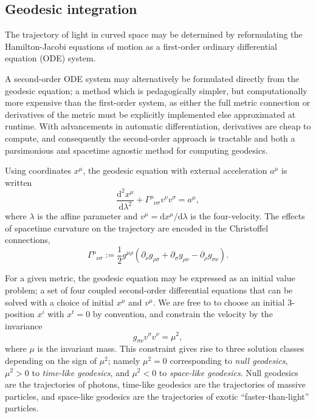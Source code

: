 \documentclass[fleqn,usenatbib]{mnras}
\renewcommand{\d}{\text{d}}
\newcommand{\utensor}[3]{#1^{#2}_{\phantom{#2}#3}}
\newcommand{\vel}[1]{v^{#1}}
\begin{document}
\subsection{Geodesic integration}

The trajectory of light in curved space may be determined by reformulating the
Hamilton-Jacobi equations of motion as a first-order ordinary differential
equation (ODE) system.

A second-order ODE system may alternatively be formulated directly from the
geodesic equation; a method which is pedagogically simpler, but computationally
more expensive than the first-order system, as either the full metric connection
or derivatives of the metric must be explicitly implemented else approximated at
runtime. With advancements in automatic differentiation, derivatives are cheap
to compute, and consequently the second-order approach is tractable and both a
parsimonious and spacetime agnostic method for computing geodesics.

Using coordinates $x^\mu$, the geodesic equation with external acceleration
$a^\mu$ is written
\begin{equation}
\label{eq:geodesic_equation}
    \frac{\d^2 x^\mu}{\d \lambda^2}
    + \utensor{\Gamma}{\mu}{\nu\sigma}
    \vel{\nu}
    \vel{\sigma}
    = a^\mu,
\end{equation}
where $\lambda$ is the affine parameter and $v^\mu = \d x^\mu / \d \lambda$ is
the four-velocity. The effects of spacetime curvature on the trajectory are
encoded in the Christoffel connections,
\begin{equation}
\label{eq:christoffel}
    \utensor{\Gamma}{\mu}{\nu\sigma}
    := \frac{1}{2} g^{\mu\rho}
    \left(
        \partial_{\nu}g_{\rho \sigma}
        + \partial_{\sigma}g_{\rho \nu}
        - \partial_{\rho}g_{\sigma \nu}
    \right).
\end{equation}

For a given metric, the geodesic equation may be expressed as an initial value
problem; a set of four coupled second-order differential equations that can be
solved with a choice of initial $x^\mu$ and $\vel{\mu}$. We are free to to
choose an initial 3-position $x^i$ with $x^t = 0$ by convention, and constrain
the velocity by the invariance
\begin{equation}
\label{eq:velocity_constraint}
    g_{\sigma\nu} \vel{\sigma} \vel{\nu} = \mu^2,
\end{equation}
where $\mu$ is the invariant mass. This constraint gives rise to three solution
classes depending on the sign of $\mu^2$; namely $\mu^2 = 0$ corresponding to
\emph{null geodesics}, $\mu^2 > 0$ to \emph{time-like geodesics}, and $\mu^2 <
0$ to \emph{space-like geodesics}. Null geodesics are the trajectories of
photons, time-like geodesics are the trajectories of massive particles, and
space-like geodesics are the trajectories of exotic ``faster-than-light''
particles.
\end{document}
